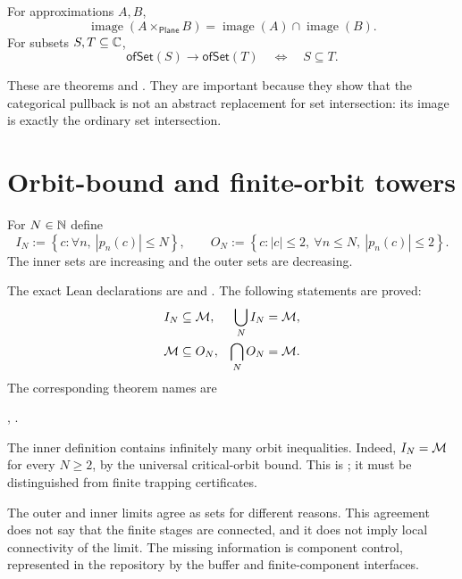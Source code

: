 \begin{theorem}
\label{thm:categorical-image-intersection}
For approximations $A,B$,
\[
 \operatorname{image}(A\times_{\mathsf{Plane}}B)
 =
 \operatorname{image}(A)\cap\operatorname{image}(B).
\]
For subsets $S,T\subseteq\mathbb C$,
\[
 \mathsf{ofSet}(S)\longrightarrow\mathsf{ofSet}(T)
\quad\Longleftrightarrow\quad S\subseteq T.
\]
\end{theorem}

These are theorems
 and
.  They are important because
they show that the categorical pullback is not an abstract replacement for
set intersection: its image is exactly the ordinary set intersection.

\section{Orbit-bound and finite-orbit towers}

\begin{definition}
\label{def:categorical-orbit-tower}
For $N\in\mathbb N$ define
\[
 I_N:=\left\{c:\forall n,\ |p_n(c)|\le N\right\},
\qquad
 O_N:=\left\{c:|c|\le2,\ \forall n\le N,\ |p_n(c)|\le2\right\}.
\]
The inner sets are increasing and the outer sets are decreasing.
\end{definition}

The exact Lean declarations are
 and
.  The following statements are
proved:
\begin{align*}
 I_N&\subseteq\mathcal M,
 &\bigcup_N I_N&=\mathcal M,\\
 \mathcal M&\subseteq O_N,
 &\bigcap_N O_N&=\mathcal M.
\end{align*}
The corresponding theorem names are
\begin{center}
,
\qquad
{}.
\end{center}

\begin{remark}
The inner definition contains infinitely many orbit inequalities.
Indeed, $I_N=\mathcal M$ for every $N\ge2$, by the universal critical-orbit
bound.  This is
;
it must be distinguished from finite trapping certificates.

The outer and inner limits agree as sets for different reasons.  This
agreement does not say that the finite stages are connected, and it does not
imply local connectivity of the limit.  The missing information is
component control, represented in the repository by the buffer and
finite-component interfaces.
\end{remark}

